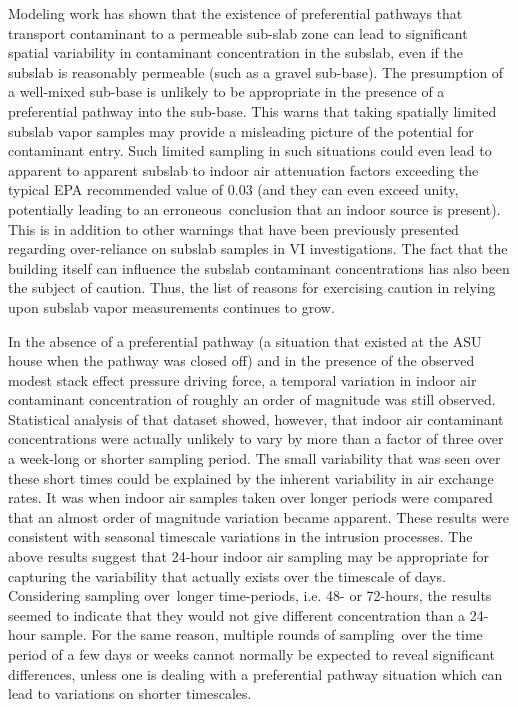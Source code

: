 Modeling work has shown that the existence of preferential pathways that transport contaminant to a permeable sub-slab zone can lead to significant spatial variability in contaminant concentration in the subslab, even if the subslab is reasonably permeable (such as a gravel sub-base).
The presumption of a well-mixed sub-base is unlikely to be appropriate in the presence of a preferential pathway into the sub-base.
This warns that taking spatially limited subslab vapor samples may provide a misleading picture of the potential for contaminant entry.
Such limited sampling in such situations could even lead to apparent to apparent subslab to indoor air attenuation factors exceeding the typical EPA recommended value of 0.03 (and they can even exceed unity, potentially leading to an erroneous conclusion that an indoor source is present).
This is in addition to other warnings that have been previously presented regarding over-reliance on subslab samples in VI investigations\cite{chow_concentration_2007,folkes_observed_2009,u.s._environmental_protection_agency_assessment_2015,pennell_development_2009}.
The fact that the building itself can influence the subslab contaminant concentrations has also been the subject of caution\cite{holton_creation_2018}.
Thus, the list of reasons for exercising caution in relying upon subslab vapor measurements continues to grow.\par

In the absence of a preferential pathway (a situation that existed at the ASU house when the pathway was closed off) and in the presence of the observed modest stack effect pressure driving force, a temporal variation in indoor air contaminant concentration of roughly an order of magnitude was still observed.
Statistical analysis of that dataset showed, however, that indoor air contaminant concentrations were actually unlikely to vary by more than a factor of three over a week-long or shorter sampling period.
The small variability that was seen over these short times could be explained by the inherent variability in air exchange rates.
It was when indoor air samples taken over longer periods were compared that an almost order of magnitude variation became apparent.
These results were consistent with seasonal timescale variations in the intrusion processes.
The above results suggest that 24-hour indoor air sampling may be appropriate for capturing the variability that actually exists over the timescale of days. Considering sampling over longer time-periods, i.e. 48- or 72-hours, the results seemed to indicate that they would not give different concentration than a 24-hour sample.
For the same reason, multiple rounds of sampling over the time period of a few days or weeks cannot normally be expected to reveal significant differences, unless one is dealing with a preferential pathway situation which can lead to variations on shorter timescales.\par

